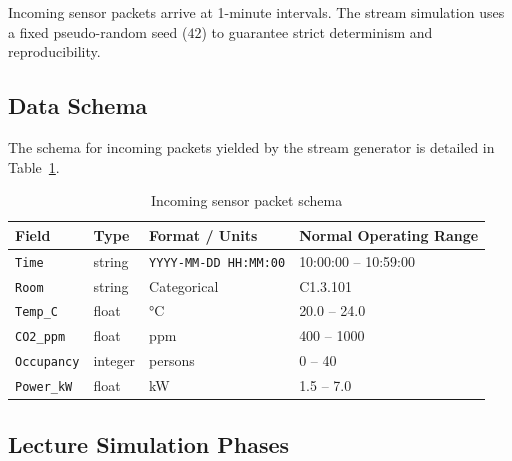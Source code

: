 \documentclass[12pt,a4paper]{article}
\begin{document}
Incoming sensor packets arrive at 1-minute intervals. The stream simulation uses a fixed pseudo-random seed ($42$) to guarantee strict determinism and reproducibility.

\subsection{Data Schema}

The schema for incoming packets yielded by the stream generator is detailed in Table~\ref{tab:schema}.

\begin{table}[h!]
\centering
\caption{Incoming sensor packet schema}
\label{tab:schema}
\begin{tabular}{llll}
\toprule
\textbf{Field} & \textbf{Type} & \textbf{Format / Units} & \textbf{Normal Operating Range} \\
\midrule
\texttt{Time}       & string  & \texttt{YYYY-MM-DD HH:MM:00} & 10:00:00 -- 10:59:00 \\
\texttt{Room}       & string  & Categorical                  & C1.3.101 \\
\texttt{Temp\_C}    & float   & °C                           & 20.0 -- 24.0 \\
\texttt{CO2\_ppm}   & float   & ppm                          & 400 -- 1000 \\
\texttt{Occupancy}  & integer & persons                      & 0 -- 40 \\
\texttt{Power\_kW}  & float   & kW                           & 1.5 -- 7.0 \\
\bottomrule
\end{tabular}
\end{table}

\subsection{Lecture Simulation Phases}
\end{document}
